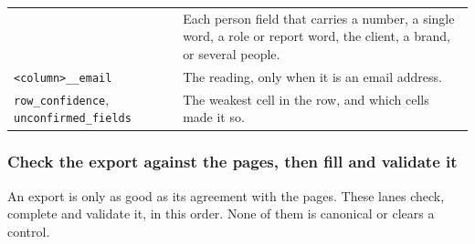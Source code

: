 \documentclass[
]{article}
\begin{document}
{\begin{longtable}[]{@{}
  >{\raggedright\arraybackslash}p{}
  >{\raggedright\arraybackslash}p{}@{}}
& Each person field that carries a number, a single word, a role or
report word, the client, a brand, or several people. \\
\texttt{<column>\_\allowbreak{}\_\allowbreak{}email} & The reading, only
when it is an email address. \\
\texttt{row\_\allowbreak{}confidence},
\texttt{unconfirmed\_\allowbreak{}fields} & The weakest cell in the row,
and which cells made it so. \\
\end{longtable}
}

\subsubsection{Check the export against the pages, then fill and
validate
it}\label{check-the-export-against-the-pages-then-fill-and-validate-it}

An export is only as good as its agreement with the pages. These lanes
check, complete and validate it, in this order. None of them is
canonical or clears a control.
\end{document}
